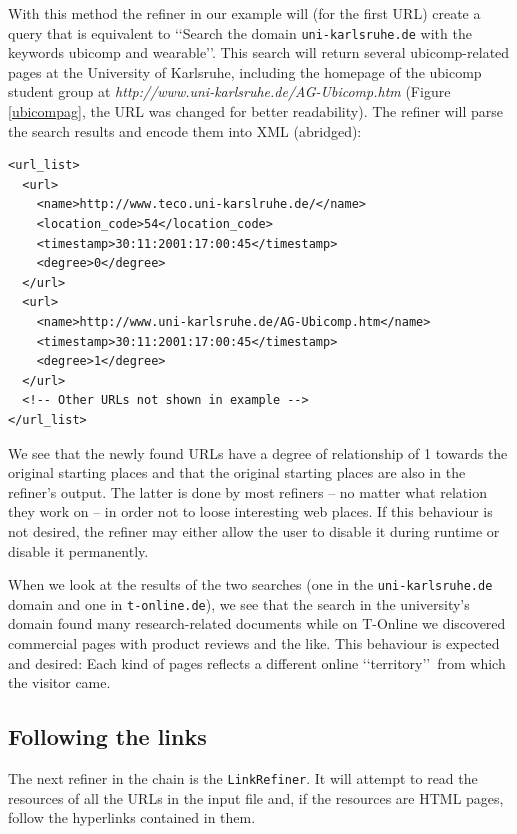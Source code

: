 \documentclass[a4paper,twoside]{danarticle}
\theoremstyle{remark}
\begin{document}
      With this method the refiner in our example will (for the first URL)
      create a query that is equivalent to \lq\lq Search the domain
      \verb$uni-karlsruhe.de$ with the keywords ubicomp and wearable\rq\rq .
      This search will return several ubicomp-related pages at the University of
      Karlsruhe, including the homepage of the ubicomp student group at 
      \textit{http://www.uni-karlsruhe.de/AG-Ubicomp.htm} (Figure
      \ref{ubicompag}, the URL
      was changed for better readability). The refiner will parse the search
      results and encode them into XML (abridged):
      \begin{verbatim}
<url_list>
  <url> 
    <name>http://www.teco.uni-karslruhe.de/</name> 
    <location_code>54</location_code> 
    <timestamp>30:11:2001:17:00:45</timestamp> 
    <degree>0</degree> 
  </url> 
  <url>
    <name>http://www.uni-karlsruhe.de/AG-Ubicomp.htm</name> 
    <timestamp>30:11:2001:17:00:45</timestamp> 
    <degree>1</degree> 
  </url>
  <!-- Other URLs not shown in example --> 
</url_list>
      \end{verbatim}
      
      We see that the newly found URLs have a degree of relationship of 1
      towards the original starting places and that the original starting places
      are also in the refiner's output. The latter is done by most refiners -- no
      matter what relation they work on -- in order not to loose interesting web
      places. If this behaviour is not desired, the refiner may either allow the
      user to disable it during runtime or disable it permanently.
      
      When we look at the results of the two searches 
      (one in the \verb$uni-karlsruhe.de$ domain and one in \verb$t-online.de$),
      we see that the search in the university's domain found many
      research-related documents while on T-Online we discovered commercial pages
      with product reviews and the like. This behaviour is expected and desired: 
      Each kind
      of pages reflects a different online \lq\lq territory\rq\rq\ from which
      the visitor came.
    \subsection{Following the links}
      The next refiner in the chain is the \verb$LinkRefiner$. It will attempt
      to read the resources of all the URLs in the input file and, if the
      resources are HTML pages, follow the hyperlinks contained in them.
      
\end{document}
